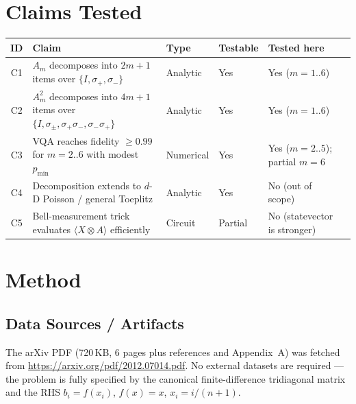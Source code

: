 \documentclass[11pt]{article}
\begin{document}
\section{Claims Tested}
\begin{center}
\begin{tabular}{clllll}
\toprule
ID & Claim & Type & Testable & Tested here \\
\midrule
C1 & $A_m$ decomposes into $2m+1$ items over $\{I,\sigma_+,\sigma_-\}$ & Analytic & Yes & Yes ($m=1..6$) \\
C2 & $A_m^2$ decomposes into $4m+1$ items over $\{I,\sigma_\pm,\sigma_+\sigma_-,\sigma_-\sigma_+\}$ & Analytic & Yes & Yes ($m=1..6$) \\
C3 & VQA reaches fidelity $\geq 0.99$ for $m=2..6$ with modest $p_{\min}$ & Numerical & Yes & Yes ($m=2..5$); partial $m=6$ \\
C4 & Decomposition extends to $d$-D Poisson / general Toeplitz & Analytic & Yes & No (out of scope) \\
C5 & Bell-measurement trick evaluates $\langle X \otimes A\rangle$ efficiently & Circuit & Partial & No (statevector is stronger) \\
\bottomrule
\end{tabular}
\end{center}

\section{Method}

\subsection{Data Sources / Artifacts}
The arXiv PDF (720\,KB, 6 pages plus references and Appendix~A) was fetched from
\url{https://arxiv.org/pdf/2012.07014.pdf}. No external datasets are required
--- the problem is fully specified by the canonical finite-difference
tridiagonal matrix and the RHS $b_i = f(x_i)$, $f(x)=x$, $x_i = i/(n+1)$.
\end{document}

